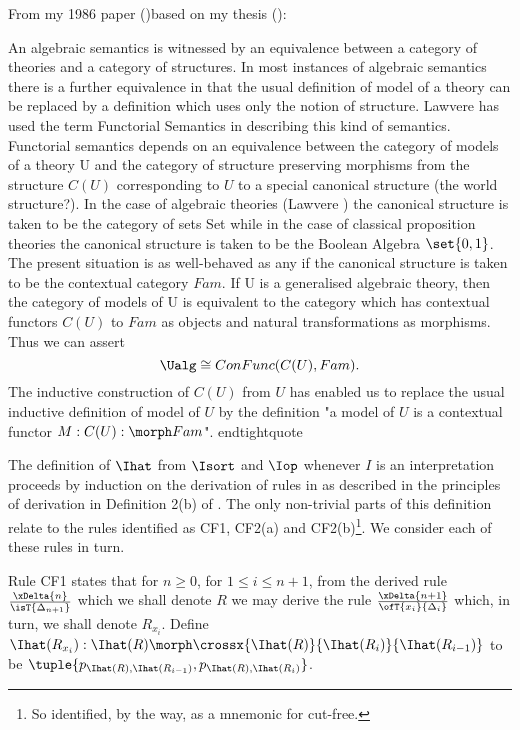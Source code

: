 \note From my 1986 paper (\cite{Cartmell86})based on my thesis (\cite{Cartmell78}):
\begin{tightquote}
An algebraic semantics is witnessed by an equivalence between a category of
theories and a category of structures. In most instances of algebraic semantics
there is a further equivalence in that the usual definition of model of a theory can
be replaced by a definition which uses only the notion of structure. Lawvere has
used the term Functorial Semantics in describing this kind of semantics.
Functorial semantics depends on an equivalence between the category of models
of a theory U and the category of structure preserving morphisms from the
structure $C(U)$ corresponding to $U$ to a special canonical structure (the world
structure?). In the case of algebraic theories (Lawvere \cite{LawvereAlgebraicTheories}) the canonical structure
is taken to be the category of sets Set while in the case of classical proposition
theories the canonical structure is taken to be the Boolean Algebra $\set{0, 1}$.
The present situation is as well-behaved as any if the canonical structure is
taken to be the contextual category $Fam$.
If U is a generalised algebraic theory, then the category of models of U is
equivalent to the category which has contextual functors $C(U)$ to $Fam$ as objects
and natural transformations as morphisms. Thus we can assert
\begin{equation*}
\Ualg \cong ConFunc(C(U), Fam).
\end{equation*}
The inductive construction of $C(U)$ from $U$ has enabled us to replace the usual 
inductive definition of model of $U$ by the definition "a model of $U$ is a contextual
functor $M: C(U): \morph Fam$".
end{tightquote}

\begin{oldtt}
\note The definition of $\Ihat$ from $\Isort$ and $\Iop$ whenever $I$ is an interpretation proceeds by induction 
on the derivation of rules in  \gatUw 
as described in the principles of derivation in Definition 2(b) of \cite{Cartmell86}. 
The only non-trivial parts of this definition relate to the rules
identified as CF1, CF2(a) and CF2(b)\footnote{So identified, by the way, as a mnemonic for cut-free.}. We consider each of these rules in turn.

\begin{point}
Rule CF1 states that for $n \geq 0$, for $1 \leq i \leq n+1$, from the derived rule 
$\frac{\xDelta{n}}{\isT{\Delta_{n+1}}}$ which we shall denote $R$ 
we may derive the rule
$\frac{\xDelta{n+1}}{\ofT{x_i}{\Delta_i}}$ which, in turn, we shall denote $R_{x_i}$.
Define $\Ihat(R_{x_i}) :  \Ihat(R) \morph \crossx{\Ihat(R)}{\Ihat(R_i)}{\Ihat(R_{i-1})}$
to be $\tuple{p_{\Ihat(R),\Ihat(R_{i-1})},p_{\Ihat(R),\Ihat(R_{i})}}$. 


\end{point}
\end{oldtt}
\end{tightquote}
